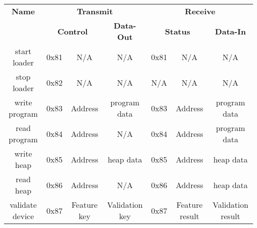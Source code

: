 	\begin{tabular}{c||cc|c||cc|c}
		\textbf{Name} & \multicolumn{3}{c||}{\textbf{Transmit}} & \multicolumn{3}{c}{\textbf{Receive}}\\
		& \multicolumn{2}{c|}{\textbf{Control}} & \textbf{Data-Out} & \multicolumn{2}{c|}{\textbf{Status}} & \textbf{Data-In} \\ \hline
		start loader & 0x81 & N/A & N/A & 0x81 & N/A & N/A\\
		stop loader & 0x82 & N/A & N/A & N/A & N/A & N/A\\
		write program & 0x83 & Address & program data & 0x83 & Address & program data\\
		read program & 0x84 & Address & N/A & 0x84 & Address & program data \\
		write heap & 0x85 & Address & heap data & 0x85 & Address & heap data\\
		read heap & 0x86 & Address & N/A & 0x86 & Address & heap data \\
		validate device & 0x87 & Feature key & Validation key & 0x87 & Feature result & Validation result \\
	\end{tabular}